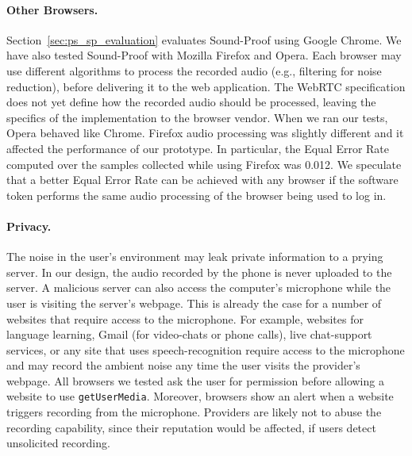 \paragraph{Other Browsers.}
Section~\ref{sec:ps_sp_evaluation} evaluates Sound-Proof using Google Chrome.
We have also tested Sound-Proof with Mozilla Firefox and Opera.
Each browser may use different algorithms to process the recorded audio (e.g., filtering for noise reduction), before delivering it to the web application.
The WebRTC specification does not yet define how the recorded audio should be processed, leaving the specifics of the implementation to the browser vendor. When we ran our tests, Opera behaved like Chrome.
Firefox audio processing was slightly different and it affected the performance of our prototype.
In particular, the Equal Error Rate computed over the samples collected while using Firefox was 0.012.
We speculate that a better Equal Error Rate can be achieved with any browser if the software token performs the same audio processing of the browser being used to log in.



\paragraph{Privacy.}
The noise in the user's environment may leak private information to a prying server. In our design, the audio recorded by the phone is never uploaded to the server.
A malicious server can also access the computer's microphone while the user is visiting the server's webpage.
This is already the case for a number of websites that require access to the microphone.
For example, websites for language learning, Gmail (for video-chats or phone calls), live chat-support services, or any site
that uses speech-recognition require access to the microphone and may record the ambient noise any time the user visits the provider's webpage.
All browsers we tested ask the user for permission before allowing a website to use \texttt{getUserMedia}. Moreover, browsers show an alert when a website triggers recording from the microphone. Providers are likely not to abuse the recording capability, since their reputation would be affected, if users detect unsolicited recording.

